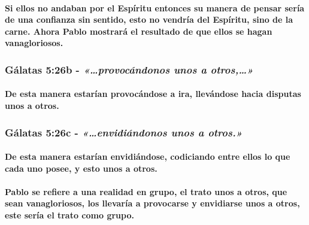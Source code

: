 \documentclass[11a pt,twoside]{article}
\newcommand{\scripture}[1]{%
  {\fontsize{12pt}{16pt}\selectfont\ScriptureFont\itshape #1}%
}
\let\oldsubsubsection\subsubsection
\renewcommand{\subsubsection}{\needspace{4\baselineskip}\oldsubsubsection}
\let\oldparagraph\paragraph
\renewcommand{\paragraph}{\needspace{3\baselineskip}\oldparagraph}
\begin{document}
\paragraph{Si ellos no andaban por el Espíritu entonces su manera de
pensar sería de una confianza sin sentido, esto no vendría del Espíritu,
sino de la carne. Ahora Pablo mostrará el resultado de que ellos se
hagan
vanagloriosos.}\label{si-ellos-no-andaban-por-el-espuxedritu-entonces-su-manera-de-pensar-seruxeda-de-una-confianza-sin-sentido-esto-no-vendruxeda-del-espuxedritu-sino-de-la-carne.-ahora-pablo-mostraruxe1-el-resultado-de-que-ellos-se-hagan-vanagloriosos.}

\subsubsection{\texorpdfstring{Gálatas 5:26b -
\scripture{«…provocándonos unos a otros,…»}}{Gálatas 5:26b - }}\label{guxe1latas-526b---provocuxe1ndonos-unos-a-otros}

\paragraph{De esta manera estarían provocándose a ira, llevándose hacia
disputas unos a
otros.}\label{de-esta-manera-estaruxedan-provocuxe1ndose-a-ira-llevuxe1ndose-hacia-disputas-unos-a-otros.}

\subsubsection{\texorpdfstring{Gálatas 5:26c -
\scripture{«…envidiándonos unos a otros.»}}{Gálatas 5:26c - }}\label{guxe1latas-526c---envidiuxe1ndonos-unos-a-otros.}

\paragraph{De esta manera estarían envidiándose, codiciando entre ellos
lo que cada uno posee, y esto unos a
otros.}\label{de-esta-manera-estaruxedan-envidiuxe1ndose-codiciando-entre-ellos-lo-que-cada-uno-posee-y-esto-unos-a-otros.}

\paragraph{Pablo se refiere a una realidad en grupo, el trato unos a
otros, que sean vanagloriosos, los llevaría a provocarse y envidiarse
unos a otros, este sería el trato como
grupo.}\label{pablo-se-refiere-a-una-realidad-en-grupo-el-trato-unos-a-otros-que-sean-vanagloriosos-los-llevaruxeda-a-provocarse-y-envidiarse-unos-a-otros-este-seruxeda-el-trato-como-grupo.}
\end{document}
